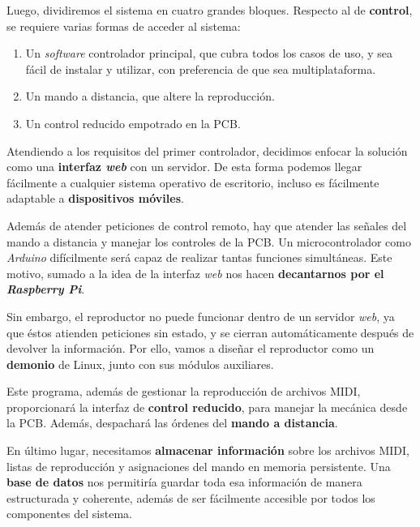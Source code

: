 \smallskip

Luego, dividiremos el sistema en cuatro grandes bloques. Respecto al de \textbf{control}, se requiere varias formas de acceder al sistema:

\begin{enumerate}
	\item Un \textit{software} controlador principal, que cubra todos los casos de uso, y sea fácil de instalar y utilizar, con preferencia de que sea multiplataforma.
	
	\item Un mando a distancia, que altere la reproducción.
	
	\item Un control reducido empotrado en la \acrshort{PCB}.
\end{enumerate}

Atendiendo a los requisitos del primer controlador, decidimos enfocar la solución como una \textbf{interfaz \textit{web}} con un servidor. De esta forma podemos llegar fácilmente a cualquier sistema operativo de escritorio, incluso es fácilmente adaptable a \textbf{dispositivos móviles}.

Además de atender peticiones de control remoto, hay que atender las señales del mando a distancia y manejar los controles de la \acrshort{PCB}. Un microcontrolador como \textit{Arduino} difícilmente será capaz de realizar tantas funciones simultáneas. Este motivo, sumado a la idea de la interfaz \textit{web} nos hacen \textbf{decantarnos por el \textit{Raspberry Pi}}.

Sin embargo, el reproductor no puede funcionar dentro de un servidor \textit{web}, ya que éstos atienden peticiones sin estado, y se cierran automáticamente después de devolver la información. Por ello, vamos a diseñar el reproductor como un \textbf{demonio} de Linux, junto con sus módulos auxiliares.

Este programa, además de gestionar la reproducción de archivos \acrshort{MIDI}, proporcionará la interfaz de \textbf{control reducido}, para manejar la mecánica desde la \acrshort{PCB}. Además, despachará las órdenes del \textbf{mando a distancia}.

En último lugar, necesitamos \textbf{almacenar información} sobre los archivos \acrshort{MIDI}, listas de reproducción y asignaciones del mando en memoria persistente. Una \textbf{base de datos} nos permitiría guardar toda esa información de manera estructurada y coherente, además de ser fácilmente accesible por todos los componentes del sistema.

